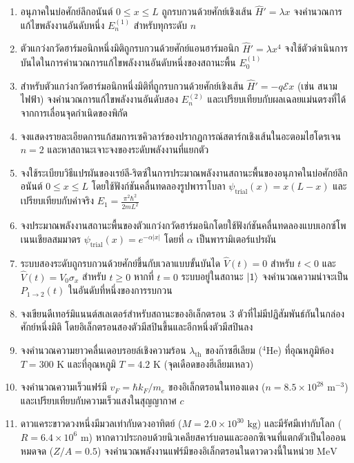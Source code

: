 \begin{enumerate}[label=\textbf{\arabic*.}]
    \item อนุภาคในบ่อศักย์ลึกอนันต์ $0 \le x \le L$ ถูกรบกวนด้วยศักย์เชิงเส้น $\hat{H}' = \lambda x$ จงคำนวณการแก้ไขพลังงานอันดับหนึ่ง $E_n^{(1)}$ สำหรับทุกระดับ $n$
    \item ตัวแกว่งกวัดฮาร์มอนิกหนึ่งมิติถูกรบกวนด้วยศักย์แอนฮาร์มอนิก $\hat{H}' = \lambda x^4$ จงใช้ตัวดำเนินการบันไดในการคำนวณการแก้ไขพลังงานอันดับหนึ่งของสถานะพื้น $E_0^{(1)}$
    \item สำหรับตัวแกว่งกวัดฮาร์มอนิกหนึ่งมิติที่ถูกรบกวนด้วยศักย์เชิงเส้น $\hat{H}' = -q \mathcal{E} x$ (เช่น สนามไฟฟ้า) จงคำนวณการแก้ไขพลังงานอันดับสอง $E_n^{(2)}$ และเปรียบเทียบกับผลเฉลยแม่นตรงที่ได้จากการเลื่อนจุดกำเนิดของพิกัด
    \item จงแสดงรายละเอียดการแก้สมการเซคิวลาร์ของปรากฏการณ์สตาร์กเชิงเส้นในอะตอมไฮโดรเจน $n = 2$ และหาสถานะเจาะจงของระดับพลังงานที่แยกตัว
    \item จงใช้ระเบียบวิธีแปรผันของเรย์ลี-ริตซ์ในการประมาณพลังงานสถานะพื้นของอนุภาคในบ่อศักย์ลึกอนันต์ $0 \le x \le L$ โดยใช้ฟังก์ชันคลื่นทดลองรูปพาราโบลา $\psi_{\text{trial}}(x) = x(L - x)$ และเปรียบเทียบกับค่าจริง $E_1 = \frac{\pi^2 \hbar^2}{2m L^2}$
    \item จงประมาณพลังงานสถานะพื้นของตัวแกว่งกวัดฮาร์มอนิกโดยใช้ฟังก์ชันคลื่นทดลองแบบเอกซ์โพเนนเชียลสมมาตร $\psi_{\text{trial}}(x) = e^{-\alpha |x|}$ โดยที่ $\alpha$ เป็นพารามิเตอร์แปรผัน
    \item ระบบสองระดับถูกรบกวนด้วยศักย์ขึ้นกับเวลาแบบขั้นบันได $\hat{V}(t) = 0$ สำหรับ $t < 0$ และ $\hat{V}(t) = V_0 \sigma_x$ สำหรับ $t \ge 0$ หากที่ $t = 0$ ระบบอยู่ในสถานะ $\ket{1}$ จงคำนวณความน่าจะเป็น $P_{1 \to 2}(t)$ ในอันดับที่หนึ่งของการรบกวน
    \item จงเขียนดีเทอร์มิแนนต์สเลเตอร์สำหรับสถานะของอิเล็กตรอน 3 ตัวที่ไม่มีปฏิสัมพันธ์กันในกล่องศักย์หนึ่งมิติ โดยอิเล็กตรอนสองตัวมีสปินขึ้นและอีกหนึ่งตัวมีสปินลง
    \item จงคำนวณความยาวคลื่นเดอบรอยล์เชิงความร้อน $\lambda_{\text{th}}$ ของก๊าซฮีเลียม ($^4\text{He}$) ที่อุณหภูมิห้อง $T = 300\text{ K}$ และที่อุณหภูมิ $T = 4.2\text{ K}$ (จุดเดือดของฮีเลียมเหลว)
    \item จงคำนวณความเร็วแฟร์มี $v_F = \hbar k_F / m_e$ ของอิเล็กตรอนในทองแดง ($n = 8.5 \times 10^{28}\text{ m}^{-3}$) และเปรียบเทียบกับความเร็วแสงในสุญญากาศ $c$
    \item ดาวแคระขาวดวงหนึ่งมีมวลเท่ากับดวงอาทิตย์ ($M = 2.0 \times 10^{30}\text{ kg}$) และมีรัศมีเท่ากับโลก ($R = 6.4 \times 10^6\text{ m}$) หากดาวประกอบด้วยนิวเคลียสคาร์บอนและออกซิเจนที่แตกตัวเป็นไอออนหมดจด ($Z/A = 0.5$) จงคำนวณพลังงานแฟร์มีของอิเล็กตรอนในดาวดวงนี้ในหน่วย $\text{MeV}$

\end{enumerate}

